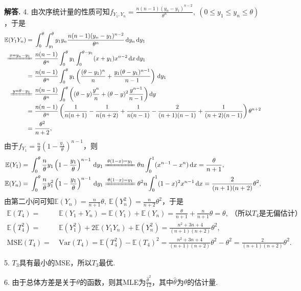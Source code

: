 \documentclass[12pt, a4paper, oneside]{ctexart}
\newenvironment{solution}[1][]{\par\noindent\textbf{#1解答. }}{\smallskip\par}  %
\let\leq=\leqslant %
\def\E{\mathbb{E}}          %
\def\var{\text{Var}}        %
\def\d{\mathrm{d}}          %
\begin{document}
\begin{solution}
    4. 由次序统计量的性质可知$f_{Y_1,Y_n} = \frac{n(n-1)(y_n-y_1)^{n-2}}{\theta^n},\ (0\leq y_1\leq y_n\leq \theta)$，于是
    \begin{align*}
        \E(Y_1Y_n)=&\ \int_0^\theta\int_{y_1}^\theta y_1y_n\frac{n(n-1)(y_n-y_1)^{n-2}}{\theta^n}\,\d y_n\,\d y_1\\
        \xlongequal{x=y_n-y_1}&\ \frac{n(n-1)}{\theta^n}\int_0^\theta y_1\int_0^{\theta-y_1}(x+y_1)x^{n-2}\,\d x\,\d y_1\\
        =&\ \frac{n(n-1)}{\theta^n}\int_0^\theta y_1\left(\frac{(\theta-y_1)^n}{n}+\frac{y_1(\theta-y_1)^{n-1}}{n-1}\right)\,\d y_1\\
        \xlongequal{y=\theta-y_1}&\ \frac{n(n-1)}{\theta^n}\int_0^\theta\left((\theta-y)\frac{y^n}{n}+(\theta-y)^2\frac{y^{n-1}}{n-1}\right)\d y\\
        =&\ \frac{n(n-1)}{\theta^n}\left(\frac{1}{n(n+1)}-\frac{1}{n(n+2)}+\frac{1}{n(n-1)}-\frac{2}{(n+1)(n-1)}+\frac{1}{(n+2)(n-1)}\right)\theta^{n+2}\\
        =&\ \frac{\theta^2}{n+2},
    \end{align*}
    由于$f_{Y_1} = \frac{n}{\theta}(1-\frac{y_1}{\theta})^{n-1}$，则
    \begin{align*}
        \E(Y_1) =&\ \int_0^{\theta}\frac{n}{\theta}y_1\left(1-\frac{y_1}{\theta}\right)^{n-1}\,\d y_1
        \xlongequal{\theta(1-x)=y_1} \theta n\int_0^{1}(x^{n-1}-x^n)\,\d x
        = \frac{\theta}{n+1},\\
        \E(Y_n) =&\ \int_0^\theta\frac{n}{\theta}y_1^2\left(1-\frac{y_1}{\theta}\right)^{n-1}\,\d y_1
        \xlongequal{\theta(1-x) = y_1} \theta^2n\int_0^1(1-x)^2x^{n-1}\,\d x
        = \frac{2}{(n+1)(n+2)}\theta^2,
    \end{align*}
    由第二小问可知$\E(Y_n) = \frac{n}{n+1}\theta,\ \E(Y_n^2) = \frac{n}{n+2}\theta^2$，于是
    \begin{align*}
        \E(T_4)=&\ \E(Y_1+Y_n) = \E(Y_1)+\E(Y_n) = \frac{\theta}{n+1}+\frac{n}{n+1}\theta = \theta,\ \text{（所以}T_4\text{是无偏估计）}\\
        \E(T_4^2) =&\ \E(Y_1^2)+2\E(Y_1Y_n)+\E(Y_n^2) = \frac{n^2+3n+4}{(n+1)(n+2)}\theta^2,\\
        \text{MSE}(T_4) =&\ \var(T_4) = \E(T_4^2)-\E(T_4)^2 = \frac{n^2+3n+4}{(n+1)(n+2)}\theta^2-\theta^2 = \frac{2}{(n+1)(n+2)}\theta^2.
    \end{align*}

    5. $T_3$具有最小的MSE，所以$T_3$最优.

    6. 由于总体方差是关于$\theta$的函数，则其MLE为$\frac{\hat{\theta}^2}{12}$，其中$\hat{\theta}$为$\theta$的估计量.
\end{solution}
\end{document}
